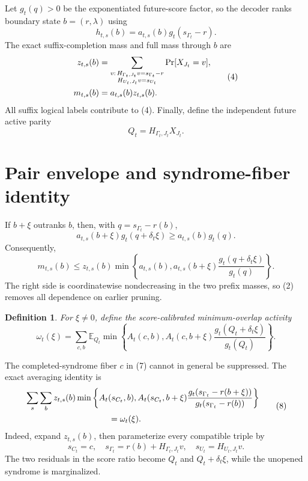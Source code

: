 \documentclass[11pt]{article}
\newtheorem{definition}[theorem]{Definition}
\newcommand{\E}{\mathbb E}
\newcommand{\Prb}{\mathop{\rm Pr}}
\newcommand{\1}{\mathbf 1}
\begin{document}
Let \(g_t(q)>0\) be the exponentiated future-score factor, so the decoder
ranks boundary state \(b=(r,\lambda)\) using
\[
  h_{t,s}(b)=a_{t,s}(b)g_t(s_{\Gamma_t}-r).
  \tag{3}
\]
The exact suffix-completion mass and full mass through \(b\) are
\[
\begin{split}
  z_{t,s}(b)
  &=
  \sum_{\substack{v:\,
    H_{\Gamma_t,J_t}v=s_{\Gamma_t}-r\\
    H_{U_t,J_t}v=s_{U_t}}}
  \Prb[X_{J_t}=v],\\
  m_{t,s}(b)&=a_{t,s}(b)z_{t,s}(b).
\end{split}
\tag{4}
\]
All suffix logical labels contribute to (4).  Finally, define the independent
future active parity
\[
  Q_t=H_{\Gamma_t,J_t}X_{J_t}.
  \tag{5}
\]

\section{Pair envelope and syndrome-fiber identity}

If \(b+\xi\) outranks \(b\), then, with
\(q=s_{\Gamma_t}-r(b)\),
\[
 a_{t,s}(b+\xi)g_t(q+\delta_t\xi)
 \ge a_{t,s}(b)g_t(q).
\]
Consequently,
\[
 m_{t,s}(b)
 \le z_{t,s}(b)
 \min\left\{
 a_{t,s}(b),
 a_{t,s}(b+\xi)
 \frac{g_t(q+\delta_t\xi)}{g_t(q)}
 \right\}.
 \tag{6}
\]
The right side is coordinatewise nondecreasing in the two prefix masses, so
(2) removes all dependence on earlier pruning.

\begin{definition}
For \(\xi\ne0\), define the score-calibrated minimum-overlap activity
\[
\boxed{
 \omega_t(\xi)=
 \sum_{c,b}\E_{Q_t}
 \min\left\{
 A_t(c,b),
 A_t(c,b+\xi)
 \frac{g_t(Q_t+\delta_t\xi)}{g_t(Q_t)}
 \right\}.}
 \tag{7}
\]
\end{definition}

The completed-syndrome fiber \(c\) in (7) cannot in general be suppressed.
The exact averaging identity is
\[
\begin{split}
&\sum_s\sum_b z_{t,s}(b)
\min\left\{
A_t(s_{C_t},b),
A_t(s_{C_t},b+\xi)
\frac{g_t(s_{\Gamma_t}-r(b+\xi))}
     {g_t(s_{\Gamma_t}-r(b))}
\right\}\\
&\hspace{35mm}=\omega_t(\xi).
\end{split}
\tag{8}
\]
Indeed, expand \(z_{t,s}(b)\), then parameterize every compatible triple by
\[
 s_{C_t}=c,\quad
 s_{\Gamma_t}=r(b)+H_{\Gamma_t,J_t}v,\quad
 s_{U_t}=H_{U_t,J_t}v.
\]
The two residuals in the score ratio become \(Q_t\) and
\(Q_t+\delta_t\xi\), while the unopened syndrome is marginalized.
\end{document}
